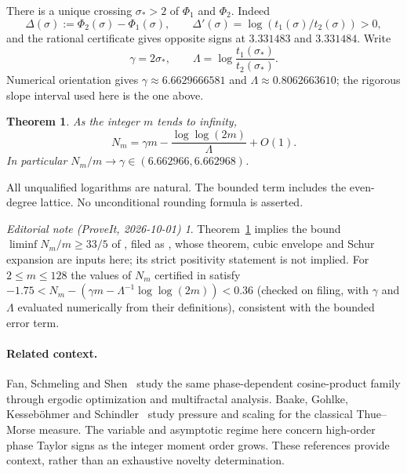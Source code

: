 \documentclass[11pt,a4paper]{article}
\newtheorem{theorem}{Theorem}[section]\newtheorem{lemma}[theorem]{Lemma}
\theoremstyle{remark}\newtheorem*{ednote}{Editorial note (ProveIt, 2026-10-01)}
\begin{document}
There is a unique crossing $\sigma_*>2$ of $\Phi_1$ and $\Phi_2$. Indeed
\begin{equation}\label{eq:delta}
 \Delta(\sigma):=\Phi_2(\sigma)-\Phi_1(\sigma),\qquad
 \Delta'(\sigma)=\log(t_1(\sigma)/t_2(\sigma))>0,
\end{equation}
and the rational certificate gives opposite signs at $3.331483$ and $3.331484$. Write
\[
 \gamma=2\sigma_*,\qquad
 \Lambda=\log\frac{t_1(\sigma_*)}{t_2(\sigma_*)}.
\]
Numerical orientation gives $\gamma\approx6.6629666581$ and $\Lambda\approx0.8062663610$; the rigorous slope interval used here is the one above.
\begin{theorem}\label{thm:main}
As the integer $m$ tends to infinity,
\begin{equation}\label{eq:main}
 N_m=\gamma m-\frac{\log\log(2m)}{\Lambda}+O(1).
\end{equation}
In particular $N_m/m\to\gamma\in(6.662966,6.662968)$.
\end{theorem}
All unqualified logarithms are natural. The bounded term includes the even-degree lattice. No unconditional rounding formula is asserted.
\begin{ednote}
Theorem~\ref{thm:main} implies the bound $\liminf N_m/m\ge33/5$ of \cite{Bound66}, filed as
, whose theorem, cubic envelope and Schur expansion are inputs
here; its strict positivity statement is not implied. For $2\le m\le128$ the values of $N_m$
certified in  satisfy
$-1.75<N_m-(\gamma m-\Lambda^{-1}\log\log(2m))<0.36$ (checked on filing, with $\gamma$ and
$\Lambda$ evaluated numerically from their definitions), consistent with the bounded error
term.
\end{ednote}

\paragraph{Related context.}
Fan, Schmeling and Shen~\cite{FSS} study the same phase-dependent cosine-product family through ergodic optimization and multifractal analysis. Baake, Gohlke, Kesseb\"ohmer and Schindler~\cite{BGKS} study pressure and scaling for the classical Thue--Morse measure. The variable and asymptotic regime here concern high-order phase Taylor signs as the integer moment order grows. These references provide context, rather than an exhaustive novelty determination.
\end{document}
